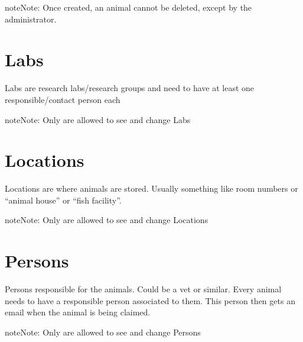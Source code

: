 \documentclass[letterpaper,10pt,openany,oneside,english]{sphinxmanual}
\begin{document}
\begin{sphinxadmonition}{note}{Note:}
Once created, an animal cannot be deleted, except by the administrator.
\end{sphinxadmonition}


\section{Labs}
\label{\detokenize{index:labs}}
Labs are research labs/research groups and need to have at least one responsible/contact person each

\noindent{}

\begin{sphinxadmonition}{note}{Note:}
Only  are allowed to see and change Labs
\end{sphinxadmonition}


\section{Locations}
\label{\detokenize{index:locations}}
Locations are where animals are stored. Usually something like room numbers or “animal house” or “fish facility”.

\noindent{}

\begin{sphinxadmonition}{note}{Note:}
Only  are allowed to see and change Locations
\end{sphinxadmonition}


\section{Persons}
\label{\detokenize{index:persons}}
Persons responsible for the animals. Could be a vet or similar.
Every animal needs to have a responsible person associated to them. This person then gets
an email when the animal is being claimed.

\noindent{}

\begin{sphinxadmonition}{note}{Note:}
Only  are allowed to see and change Persons
\end{sphinxadmonition}
\end{document}
